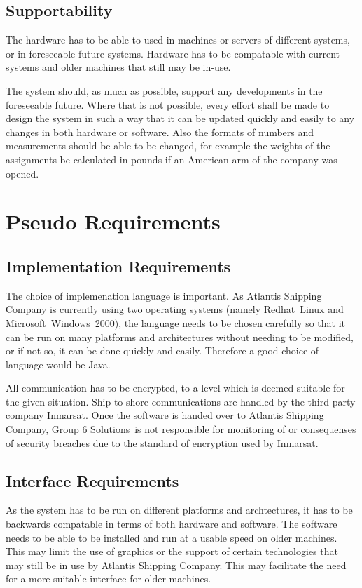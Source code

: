 \documentclass[a4paper,10pt]{report}
\begin{document}
\section{Supportability}
The hardware has to be able to used in machines or servers of different systems, or in foreseeable future systems.  Hardware has to be compatable with current systems and older machines that still may be in-use.

The system should, as much as possible, support any developments in the foreseeable future.  Where that is not possible, every effort shall be made to design the system in such a way that it can be updated quickly and easily to any changes in both hardware or software.  Also the formats of numbers and measurements should be able to be changed, for example the weights of the assignments be calculated in pounds if an American arm of the company was opened.

\chapter{Pseudo Requirements}
\section{Implementation Requirements}
The choice of implemenation language is important.  As Atlantis Shipping Company is currently using two operating systems (namely Redhat\textregistered\ Linux and Microsoft\textregistered\ Windows\textregistered\ 2000), the language needs to be chosen carefully so that it can be run on many platforms and architectures without needing to be modified, or if not so, it can be done quickly and easily.  Therefore a good choice of language would be Java.

All communication has to be encrypted, to a level which is deemed suitable for the given situation.  Ship-to-shore communications are handled by the third party company Inmarsat\textregistered .  Once the software is handed over to Atlantis Shipping Company\textregistered , Group 6 Solutions\textregistered\ is not responsible for monitoring of or consequenses of security breaches due to the standard of encryption used by Inmarsat.



\section{Interface Requirements}
As the system has to be run on different platforms and archtectures, it has to be backwards compatable in terms of both hardware and software.  The software needs to be able to be installed and run at a usable speed on older machines.  This may limit the use of graphics or the support of certain technologies that may still be in use by Atlantis Shipping Company\textregistered. This may facilitate the need for a more suitable interface for older machines.
\end{document}
